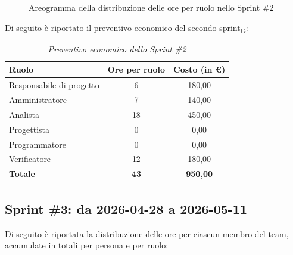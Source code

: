 \documentclass[a4paper, 10pt, colorlinks=true, linkcolor=black, urlcolor=blue, citecolor=blue, hidelinks]{article}
\renewcommand{\arraystretch}{1.2}
\begin{document}
\begin{figure}[H]

\caption{Areogramma della distribuzione delle ore per ruolo nello Sprint \#2}
\label{fig:preventivo-sprint2}
\end{figure}

Di seguito è riportato il preventivo economico del secondo sprint\textsubscript{G}:

\begin{table}[H]
    \centering
    \renewcommand{\arraystretch}{1.4}
    \begin{tabular}{|l|c|c|}
        \hline
        \rowcolor{bluBitless!15}
        \textbf{Ruolo} & \textbf{Ore per ruolo} & \textbf{Costo (in €)} \\
        \hline
        Responsabile di progetto & 6 & 180,00 \\ \hline
        Amministratore & 7 & 140,00 \\ \hline
        Analista & 18 & 450,00 \\ \hline
        Progettista & 0 & 0,00 \\ \hline
        Programmatore & 0 & 0,00 \\ \hline
        Verificatore & 12 & 180,00 \\ \hline
        \rowcolor{bluBitless!8}
        \textbf{Totale} & \textbf{43} & \textbf{950,00} \\ \hline
    \end{tabular}
    \caption{\textit{Preventivo economico dello Sprint \#2}}
\end{table}


\subsection{Sprint \#3: da 2026-04-28 a 2026-05-11}
Di seguito è riportata la distribuzione delle ore per ciascun membro del team,
accumulate in totali per persona e per ruolo:
\end{document}

